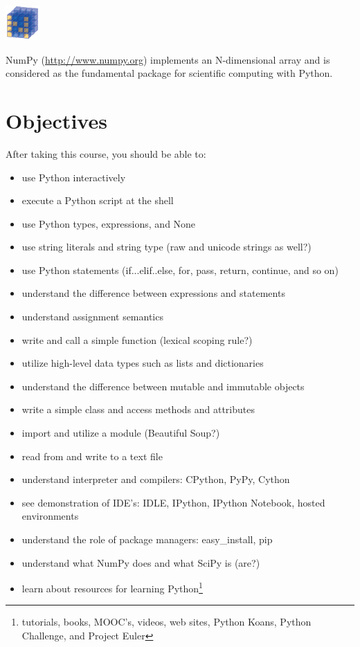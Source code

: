 \documentclass{tufte-handout}
\begin{document}
\begin{marginfigure}%
  \includegraphics[width=0.4\linewidth]{numpy}
  \caption{NumPy (\url{http://www.numpy.org}) implements an N-dimensional
    array and is considered as the fundamental package for
    scientific computing with Python.}
  \label{fig:NumPy}
\end{marginfigure} 

\section{Objectives}\label{sec:objectives }
After taking this course, you should be able to:
\begin{itemize} \itemsep1pt \parskip0pt 
  \item use Python interactively
  \item execute a Python script at the shell
  \item use Python types, expressions, and None
  \item use string literals and string type (raw and unicode strings as well?)
  \item use Python statements (if...elif..else, for, pass, return,
continue, and so on)
  \item understand the difference between expressions and statements
  \item understand assignment semantics
  \item write and call a simple function (lexical scoping rule?)
  \item utilize high-level data types such as lists and dictionaries
  \item understand the difference between mutable and immutable objects
  \item write a simple class and access methods and attributes
  \item import and utilize a module (Beautiful Soup?)
  \item read from and write to a text file
  \item understand interpreter and compilers: CPython, PyPy, Cython
  \item see demonstration of IDE's: IDLE, IPython, IPython Notebook, hosted
environments
  \item understand the role of package managers: easy\_install, pip
  \item understand what NumPy does and what SciPy is (are?) 
  \item learn about resources for learning Python\footnote{tutorials,
        books, MOOC's, videos, web sites, Python Koans, Python Challenge, and
        Project Euler}

\end{itemize}
\end{document}
